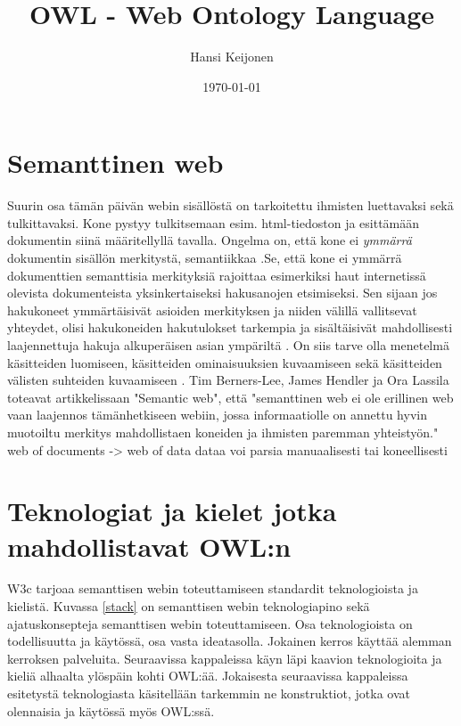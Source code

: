 \documentclass[finnish]{tktltiki2}
\title{OWL - Web Ontology Language}
\author{Hansi Keijonen}
\date{\today}
\theoremstyle{definition}
\theoremstyle{remark}
\begin{document}

\maketitle        %
\makeabstract     %

\tableofcontents  %
\newpage          %



\section{Semanttinen web}
Suurin osa tämän päivän webin sisällöstä on tarkoitettu ihmisten luettavaksi
sekä tulkittavaksi. Kone pystyy tulkitsemaan esim. html-tiedoston ja esittämään
dokumentin siinä määritellyllä tavalla. Ongelma on, että kone ei
\textit{ymmärrä} dokumentin sisällön merkitystä, semantiikkaa \cite{BHL01}.Se,
että kone ei ymmärrä dokumenttien semanttisia merkityksiä rajoittaa esimerkiksi
haut internetissä olevista dokumenteista yksinkertaiseksi hakusanojen
etsimiseksi. Sen sijaan jos hakukoneet ymmärtäisivät asioiden merkityksen ja
niiden välillä vallitsevat yhteydet, olisi hakukoneiden hakutulokset tarkempia
ja sisältäisivät mahdollisesti laajennettuja hakuja alkuperäisen asian ympäriltä
\cite{BHL01}. On siis tarve olla menetelmä  käsitteiden luomiseen, käsitteiden
ominaisuuksien kuvaamiseen sekä käsitteiden välisten suhteiden kuvaamiseen
\cite{BHL01}. Tim Berners-Lee, James Hendler ja Ora Lassila toteavat
artikkelissaan "Semantic web", että "semanttinen web ei ole erillinen web vaan
laajennos tämänhetkiseen webiin, jossa informaatiolle on annettu hyvin muotoiltu
merkitys mahdollistaen koneiden ja ihmisten paremman yhteistyön."  web of
documents -> web of data dataa voi parsia manuaalisesti tai koneellisesti

\section{Teknologiat ja kielet jotka mahdollistavat OWL:n}
W3c tarjoaa semanttisen webin toteuttamiseen standardit teknologioista ja
kielistä. Kuvassa \ref{stack} on semanttisen webin teknologiapino sekä ajatuskonsepteja
semanttisen webin toteuttamiseen. Osa teknologioista on todellisuutta ja
käytössä, osa vasta ideatasolla. Jokainen kerros käyttää alemman kerroksen
palveluita. Seuraavissa kappaleissa käyn läpi kaavion teknologioita ja kieliä
alhaalta ylöspäin kohti OWL:ää. Jokaisesta seuraavissa kappaleissa esitetystä
teknologiasta käsitellään tarkemmin ne konstruktiot, jotka ovat olennaisia ja käytössä 
myös OWL:ssä.
\end{document}
